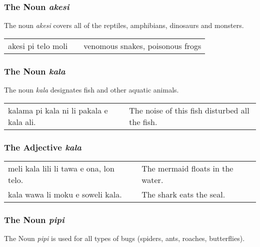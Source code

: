 %
%
\subsubsection*{The Noun \textit{akesi}}
%
%
The noun \textit{akesi} covers all of the reptiles, amphibians, dinosaurs and monsters.

\begin{supertabular}{p{5,5cm}|ll}
akesi pi telo moli && venomous snakes, poisonous frogs \\
\end{supertabular} 
%
%
\subsubsection*{The Noun \textit{kala}}
%
%
The noun \textit{kala} designates fish and other aquatic animals. 

\begin{supertabular}{p{5,5cm}|ll}
kalama pi kala ni li pakala e kala ali. && The noise of this fish disturbed all the fish. \\
\end{supertabular} 

%
\subsubsection*{The Adjective \textit{kala}}
%
%
\begin{supertabular}{p{5,5cm}|ll}
meli kala lili li tawa e ona, lon telo. && The mermaid floats in the water.  \\
kala wawa li moku e soweli kala. && The shark eats the seal.  \\
\end{supertabular} 

%
%
\subsubsection*{The Noun \textit{pipi}}
%
%
The Noun \textit{pipi} is used for all types of bugs (spiders, ants, roaches, butterflies). 

